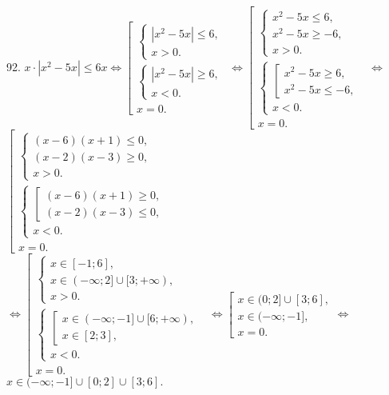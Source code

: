 92. $x\cdot|x^2-5x|\leqslant6x \Leftrightarrow \left[\begin{array}{l} \begin{cases} |x^2-5x|\leqslant6,\\ x>0.\end{cases}\\
\begin{cases} |x^2-5x|\geqslant6,\\ x<0.\end{cases}\\x=0.\end{array}\right.
\Leftrightarrow \left[\begin{array}{l} \begin{cases} x^2-5x\leqslant6,\\ x^2-5x\geqslant-6,\\ x>0.\end{cases}\\
\begin{cases} \left[\begin{array}{l}x^2-5x\geqslant6,\\ x^2-5x\leqslant-6,\end{array}\right.\\ x<0.\end{cases}\\x=0.\end{array}\right.
\Leftrightarrow$\\$ \left[\begin{array}{l} \begin{cases} (x-6)(x+1)\leqslant0,\\ (x-2)(x-3)\geqslant0,\\ x>0.\end{cases}\\
\begin{cases} \left[\begin{array}{l}(x-6)(x+1)\geqslant0,\\ (x-2)(x-3)\leqslant0,\end{array}\right.\\ x<0.\end{cases}\\x=0.\end{array}\right.$
$\Leftrightarrow\left[\begin{array}{l} \begin{cases} x\in[-1;6],\\ x\in(-\infty;2]\cup[3;+\infty),\\ x>0.\end{cases}\\
\begin{cases} \left[\begin{array}{l}x\in(-\infty;-1]\cup[6;+\infty),\\ x\in[2;3],\end{array}\right.\\ x<0.\end{cases}\\x=0.\end{array}\right.
\Leftrightarrow\left[\begin{array}{l} x\in(0;2]\cup[3;6],\\
x\in(-\infty;-1],\\x=0.\end{array}\right.\Leftrightarrow $\\$x \in (-\infty;-1]\cup[0;2]\cup[3;6].$\\
